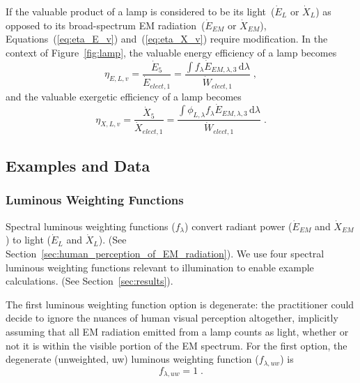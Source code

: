\documentclass[energies,article,accept,moreauthors,pdftex]{Definitions/mdpi}\usepackage[]{graphicx}\usepackage[]{color}
\begin{document}
If the valuable product of a lamp is considered to be its light~($\dot{E}_L$ or $\dot{X}_L$)
as opposed to its broad-spectrum EM radiation~($\dot{E}_{EM}$ or $\dot{X}_{EM}$),
Equations~(\ref{eq:eta_E_v}) and~(\ref{eq:eta_X_v}) require modification.
In the context of Figure~\ref{fig:lamp}, the valuable energy efficiency of a lamp becomes
\begin{equation} \label{eq:eta_E_v_light}
  \eta_{E,L,v} = \frac{\dot{E}_5}{\dot{E}_{elect,1}} 
               = \frac{\int f_\lambda \dot{E}_{EM,\lambda,3} \, \mathrm{d}\lambda}{\dot{W}_{elect,1}} \; ,
\end{equation}
%
and the valuable exergetic efficiency of a lamp becomes
\begin{equation} \label{eq:eta_X_v_light}
  \eta_{X,L,v} = \frac{\dot{X}_5}{\dot{X}_{elect,1}} 
               = \frac{\int \phi_{L,\lambda} f_\lambda \dot{E}_{EM,\lambda,3} \, \mathrm{d}\lambda}{\dot{W}_{elect,1}} \; .
\end{equation}


\subsection{Examples and Data}
\label{sec:examples_and_data}
\vspace{-6pt}

\subsubsection{Luminous Weighting Functions}
\label{sec:weighting_functions}

Spectral luminous weighting functions ($f_\lambda$) convert 
radiant power ($\dot{E}_{EM}$ and $\dot{X}_{EM}$)
to light ($\dot{E}_L$ and $\dot{X}_L$).
(See Section~\ref{sec:human_perception_of_EM_radiation}).
We use four spectral luminous weighting functions relevant to illumination
to enable example calculations.
(See Section~\ref{sec:results}).

The first luminous weighting function option is degenerate: 
the practitioner could decide to ignore the nuances of human visual perception altogether,
implicitly assuming that all EM radiation emitted from a lamp counts as light, 
whether or not it is within the visible portion of the EM spectrum.
For the first option, the degenerate (unweighted, uw) 
luminous weighting function ($f_{\lambda,uw}$) is
\begin{equation} \label{eq:f1}
  f_{\lambda,uw} = 1 \; .
\end{equation}
\end{document}
